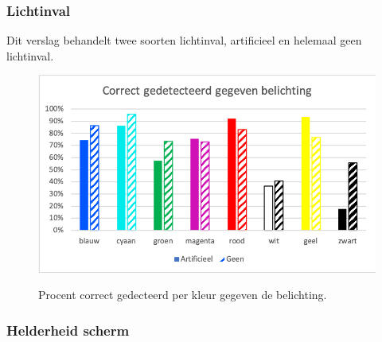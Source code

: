 \subsubsection{Lichtinval}
Dit verslag behandelt twee soorten lichtinval, artificieel en helemaal geen lichtinval. 

\begin{figure}
	\centering
	\includegraphics{img/Lightning}
	\label{fig:lichtinval}
	\caption{Procent correct gedecteerd per kleur gegeven de belichting.}
\end{figure}
\subsubsection{Helderheid scherm}
